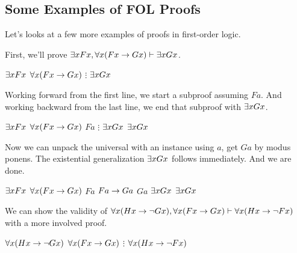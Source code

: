 \subsection{Some Examples of FOL Proofs}

Let's looks at a few more examples of proofs in first-order logic.

First, we'll prove $\exists xFx,\forall x(Fx\rightarrow Gx)\vdash\exists xGx$.

\begin{fitchproof}
   {$\exists xFx$}          
   {$\forall x(Fx\rightarrow Gx)$} 
   {$\vdots$}
   {$\exists xGx$}
\end{fitchproof}

Working forward from the first line, we start a subproof assuming $Fa$. And
working backward from the last line, we end that subproof with $\exists xGx$.

\begin{fitchproof}
   {$\exists xFx$}          
   {$\forall x(Fx\rightarrow Gx)$} 
  \open
   {$Fa$}                    
   {$\vdots$}
   {$\exists xGx$}
  \close
   {$\exists xGx$}          
\end{fitchproof}

Now we can unpack the universal with an instance using $a$, get $Ga$ by modus
ponens. The existential generalization $\exists xGx$ follows immediately. And
we are done.

\begin{fitchproof}
   {$\exists xFx$}          
   {$\forall x(Fx\rightarrow Gx)$} 
  \open
   {$Fa$}                    
   {$Fa\rightarrow Ga$}             
   {$Ga$}                    
   {$\exists xGx$}          
  \close
   {$\exists xGx$}          
\end{fitchproof}

We can show the validity of $\forall x(Hx\rightarrow\neg Gx),\forall x(Fx\rightarrow Gx)
\vdash \forall x(Hx\rightarrow\neg Fx )$ with a more involved proof.

\begin{fitchproof}
   {$\forall x(Hx\rightarrow\neg Gx)$}   
   {$\forall x(Fx\rightarrow Gx)$}         
   {$\vdots$}
   {$\forall x(Hx\rightarrow\neg Fx )$}
\end{fitchproof}

